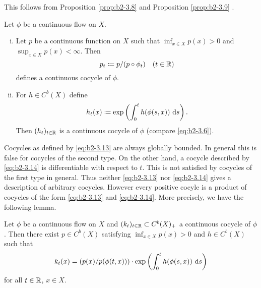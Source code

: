 This follows from Proposition \ref{prop:b2-3.8} and Proposition \ref{prop:b2-3.9} .

\begin{example}\label{ex:b2-3.11}
Let $\phi$ be a continuous flow on $X$.
\begin{enumerate}[(i), wide, labelindent=.5em]
\item \label{ex:b2-3.11-1}
Let $p$ be a continuous function on $X$ such that $\inf_{x \in X} p(x) > 0$ and $\sup_{x \in X} p(x) < \infty$.
Then
\begin{equation}\label{eq:b2-3.13}
p_{t} \coloneqq p/(p \circ \phi_{t}) \quad (t \in \mathbb{R})
\end{equation}
defines a continuous cocycle of $\phi$.
\item \label{ex:b2-3.11-2}
For $h \in C^{b}(X)$ define
\begin{equation}\label{eq:b2-3.14}
h_{t}(x) \coloneqq \exp\left(\int_{0}^{t} h(\phi(s,x))\, \mathop{}\!\mathrm{d}{s} \right).
\end{equation}
Then $(h_{t})_{t \in \mathbb{R}}$ is a continuous cocycle of $\phi$ (compare \eqref{eq:b2-3.6}).
\end{enumerate}
\end{example}

Cocycles as defined by \eqref{eq:b2-3.13} are always globally bounded.
In general this is false for cocycles of the second type.
On the other hand, a cocycle described by \eqref{eq:b2-3.14} is differentiable with respect to $t$.
This is not satisfied by cocycles of the first type in general.
Thus neither \eqref{eq:b2-3.13} nor \eqref{eq:b2-3.14} gives a description of arbitrary cocycles.
However every positive cocyle is a product of cocycles of the form \eqref{eq:b2-3.13} and \eqref{eq:b2-3.14}.
More precisely, we have the following lemma.

\begin{lemma}\label{lem:b2-3.12}
Let $\phi$ be a continuous flow on $X$ and $(k_{t})_{t \in \mathbb{R}} \subset C^{b}(X)_{+}$ a continuous cocycle of $\phi$.
Then there exist $p \in C^{b}(X)$ satisfying $\inf_{x \in X} p(x) > 0$ and $h \in C^{b}(X)$ such that
\begin{equation}\label{eq:b2-3.15}
k_{t}(x) = (p(x)/p(\phi(t,x))) \cdot \exp\left(\int_{0}^{t} h(\phi(s,x))\, \mathop{}\!\mathrm{d}{s}\right)
\end{equation}
for all $t \in \mathbb{R}$, $x \in X$.
\end{lemma}

